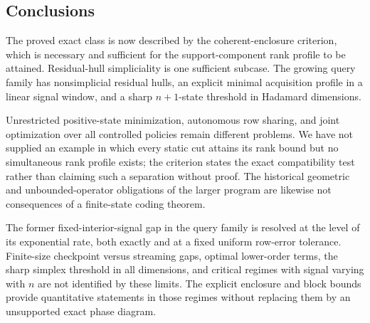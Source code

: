 \subsection{Conclusions}
The proved exact class is now described by the coherent-enclosure
criterion, which is necessary and sufficient for the support-component
rank profile to be attained. Residual-hull simpliciality is one
sufficient subcase. The growing query family has nonsimplicial residual
hulls, an explicit minimal acquisition profile in a linear signal
window, and a sharp $n+1$-state threshold in Hadamard dimensions.

Unrestricted positive-state minimization, autonomous row sharing, and
joint optimization over all controlled policies remain different
problems. We have not supplied an example in which every static cut
attains its rank bound but no simultaneous rank profile exists; the
criterion states the exact compatibility test rather than claiming
such a separation without proof. The historical geometric and
unbounded-operator obligations of the larger program are likewise
not consequences of a finite-state coding theorem.

The former fixed-interior-signal gap in the query family is resolved
at the level of its exponential rate, both exactly and at a fixed
uniform row-error tolerance. Finite-size checkpoint versus streaming
gaps, optimal lower-order terms, the sharp simplex threshold in all
dimensions, and critical regimes with signal varying with $n$ are
not identified by these limits. The explicit enclosure and block bounds
provide quantitative statements in those regimes without replacing
them by an unsupported exact phase diagram.
